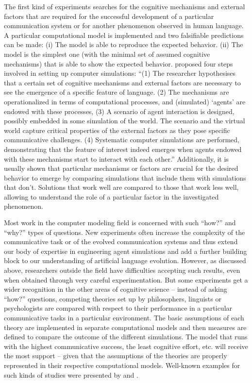 The first kind of experiments searches for the cognitive mechanisms
and external factors that are required for the successful development
of a particular communication system or for another phenomenon
observed in human language. A particular computational model is
implemented and two falsifiable predictions can be made: (i) The model
is able to reproduce the expected behavior. (ii) The model is the
simplest one (with the minimal set of assumed cognitive mechanisms)
that is able to show the expected behavior. \citet[p.324]{steels06how}
proposed four steps involved in setting up computer simulations: ``(1)
The researcher hypothesises that a certain set of cognitive mechanisms
and external factors are necessary to see the emergence of a specific
feature of language. (2) The mechanisms are operationalized in terms
of computational processes, and (simulated) `agents' are endowed with
these processes, (3) A scenario of agent interaction is designed,
possibly embedded in some simulation of the world. The scenario and
the virtual world capture critical properties of the external factors
as they pose specific communicative challenges. (4) Systematic
computer simulations are performed, demonstrating that the feature of
interest indeed emerges when agents endowed with these mechanisms
start to interact with each other.'' Additionally, it is usually shown
that particular mechanisms or factors are crucial for the desired
behavior to emerge by comparing simulations that include them with
simulations that don't. Solutions that work well are compared to those
that work less well, allowing to understand the role of a particular
factor in the investigated phenomenon.

Most work in the computer modeling field is concerned with such
``how?''  and ``why?'' types of questions. New experiments often
increase the complexity of the communicative task or of the evolved
communication systems and thus extend our body of expertise in
engineering agent simulations and add a further building block to our
understanding of artificial language evolution. However, as discussed
above, researchers outside the field have difficulties accepting such
results, even when obtained through very careful experimentation. But
some experiments get a wider recognition in the other areas of
cognitive science -- instead of asking ``how?'' questions, competing
theories set up by philosophers, linguists or psychologists are
compared with respect to their performance in a particular
communicative tasks in a particular environment. The basic assumptions
of each theory are implemented in separate computational models and
then measures are defined to compare the outcome of the different
simulations. The model that runs with the highest communicative
success, the least cognitive effort, etc. will receive the most
support -- given that the assumptions of the theories are properly
represented in their respective computational models. Well-known
examples for such kinds of studies were presented by
\cite{hurford89biological} and \cite{steels05coordinating}.

